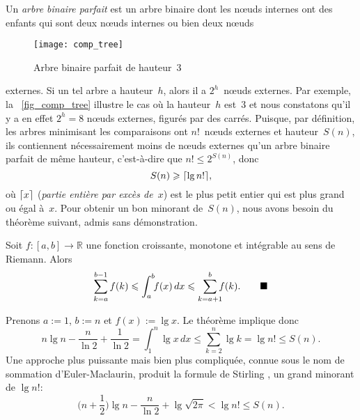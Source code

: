 %
Un \emph{arbre binaire parfait}
est un arbre binaire dont les n{\oe}uds internes ont des enfants qui
sont deux n{\oe}uds internes ou bien deux n{\oe}uds
\begin{wrapfigure}[]{r}[0pt]{0pt}
\centering
\texttt{[image: comp\_tree]}
\caption{Arbre binaire parfait de hauteur~\(3\)\label{fig_comp_tree}}
\end{wrapfigure}
externes. Si un tel arbre a hauteur~\(h\), alors il a
\(2^h\)~n{\oe}uds externes. Par exemple, la \fig~\vref{fig_comp_tree}
illustre le cas où la hauteur~\(h\) est~\(3\) et nous constatons qu'il
y a en effet \(2^h=8\) n{\oe}uds externes, figurés par des
carrés. Puisque, par définition, les arbres minimisant les
comparaisons ont \(n!\)~n{\oe}uds externes et hauteur~\(S(n)\), ils
contiennent nécessairement moins de n{\oe}uds externes qu'un arbre
binaire parfait de même hauteur, c'est-à-dire que \(n! \leqslant
2^{S(n)}\), donc
\begin{equation*}
S(n) \geqslant \lceil{\lg n!}\rceil,
\end{equation*}
où \(\lceil{x}\rceil\) (\textsl{partie entière par excès de~\(x\)})
  est le plus petit entier
qui est plus grand ou égal à~\(x\). Pour obtenir un bon minorant
de~\(S(n)\), nous avons besoin du théorème suivant, admis sans
démonstration.  \setlength{\intextsep}{12pt}
\begin{thm}
\label{thm:integral_bounds}
Soit \(f\colon [a,b] \rightarrow \mathbb{R}\) une fonction croissante,
monotone et intégrable au sens de Riemann. Alors
\begin{equation}
\abovedisplayskip=0pt
\sum_{k=a}^{b-1}f(k) \leqslant \int_{a}^{b}{\!\!f(x)} \,dx
                   \leqslant \sum_{k=a+1}^{b}{\!\!\!f(k)}.
\tag*{\(\blacksquare\)}
\end{equation}
\end{thm}
\noindent Prenons \(a := 1\), \(b := n\) et \(f(x) := \lg x\). Le
théorème implique donc
\begin{equation*}
n\lg n - \frac{n}{\ln 2} + \frac{1}{\ln 2}
= \int_{1}^{n}{\!\!\lg x} \,dx \leqslant \sum_{k=2}^{n}{\lg k}
= \lg n! \leqslant S(n).
\end{equation*}
Une approche plus puissante mais bien plus compliquée, connue sous le
nom de sommation d'Euler-Maclaurin, produit la formule de Stirling
\citep[chap.~4]{SedgewickFlajolet_1996},
un grand minorant de \(\lg n!\):
\begin{equation}
\Big(n + \frac{1}{2}\Big)\lg n - \frac{n}{\ln 2} + \lg\sqrt{2\pi}
< \lg n! \leqslant S(n).
\label{ineq_S_lower}
\end{equation}

